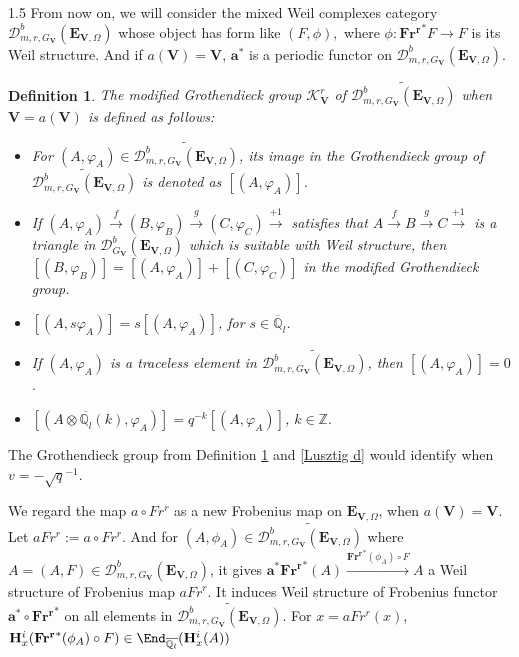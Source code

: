 \documentclass[10pt]{amsart}
\newtheorem{definition}[theorem]{Definition}
\def\bfV{{\mathbf V}}
\def\bfV{\mathbf{V}}
\newcommand\bbz{{\mathbb Z}}
\newcommand\bbq{{\mathbb Q}}
\newcommand\mk{{\mathcal{K}}}
\begin{document}
\begin{spacing}{1.5}
From now on, we will consider the mixed Weil complexes category $\mathcal{D}^b_{m,r, G_{\mathbf{V}}}(\mathbf{E}_{\mathbf{V}, \Omega})$ whose object has form like $(F,\phi),$ where $\phi: \mathbf{Fr^r}^*F\rightarrow F$ is its Weil structure. And if $a(\mathbf{V}) = \mathbf{V}$, $\mathbf{a}^*$ is a periodic functor on $\mathcal{D}^b_{m,r, G_{\mathbf{V}}}(\mathbf{E}_{\mathbf{V}, \Omega})$.
\begin{definition}\label{modified d}
The modified Grothendieck group $\mk_{\bfV}^r$ of $\widetilde{\mathcal{D}^b_{m,r,G_{\mathbf{V}}}(\mathbf{E}_{\mathbf{V}, \Omega})}$ when $\bfV=a(\bfV)$ is defined as follows:
\begin{itemize}
    \item[$\bullet$] For $(A, \varphi_A) \in \widetilde{\mathcal{D}^b_{m,r, G_{\mathbf{V}}}(\mathbf{E}_{\mathbf{V}, \Omega})}$, its image in the Grothendieck group of $\widetilde{\mathcal{D}^b_{m,r,G_{\mathbf{V}}}(\mathbf{E}_{\mathbf{V}, \Omega})}$ is denoted as $[(A, \varphi_A)]$.
    \item[$\bullet$] If $(A, \varphi_A) \xrightarrow{f} (B, \varphi_B) \xrightarrow{g} (C, \varphi_C) \xrightarrow{+1} $ satisfies that $A\xrightarrow{f} B\xrightarrow{g} C \xrightarrow{+1}$ is a triangle in $\mathcal{D}^b_{G_{\mathbf{V}}}(\mathbf{E}_{\mathbf{V}, \Omega})$ which is suitable with Weil structure, then $[(B, \varphi_B)] = [(A, \varphi_A)] + [(C, \varphi_C)]$ in the modified Grothendieck group.
    \item[$\bullet$] $[(A, s\varphi_A)] = s[(A, \varphi_A)]$, for $s \in \overline{\mathbb{Q}}_l$.
    \item[$\bullet$] If $(A, \varphi_A)$ is a traceless element in $\widetilde{\mathcal{D}^b_{m, r, G_{\mathbf{V}}}(\mathbf{E}_{\mathbf{V}, \Omega})}$, then $[(A, \varphi_A)] = 0$.
    \item[$\bullet$] $[(A\otimes \overline{\mathbb{Q}_l}(k),\varphi_A)]=q^{-k}[(A,\varphi_A)]$, $k\in \bbz.$
\end{itemize}
\end{definition}
The Grothendieck group from Definition \ref{modified d} and \ref{Lusztig d} would identify when $v=-\sqrt{q}^{-1}$.

We regard the map $a\circ Fr^r$ as a new Frobenius map on $\mathbf{E}_{\mathbf{V}, \Omega}$, when $a(\bfV)=\bfV$. Let $aFr^r:=a\circ Fr^r$. And for $(A,\phi_A)\in \widetilde{\mathcal{D}^b_{m, r, G_{\mathbf{V}}}(\mathbf{E}_{\mathbf{V}, \Omega})}$ where $A=(A,F)\in \mathcal{D}^b_{m,r, G_{\mathbf{V}}}(\mathbf{E}_{\mathbf{V}, \Omega})$, it gives $\mathbf{a}^*\mathbf{Fr^r}^*(A)\xrightarrow{\mathbf{Fr^r}^*(\phi_A)\circ F} A$ a Weil structure of Frobenius map $aFr^r$. It induces Weil structure of Frobenius functor $\mathbf{a}^*\circ \mathbf{Fr^r}^*$ on all elements in $\widetilde{\mathcal{D}^b_{m,r, G_{\mathbf{V}}}(\mathbf{E}_{\mathbf{V}, \Omega})}$. For $x=aFr^r(x)$, $\mathbf{H}^i_x(\mathbf{Fr^r}^*(\phi_A)\circ F)\in \End_{\overline{\bbq_l}}(\mathbf{H}^i_x(A))$


\end{spacing}
\end{document}
